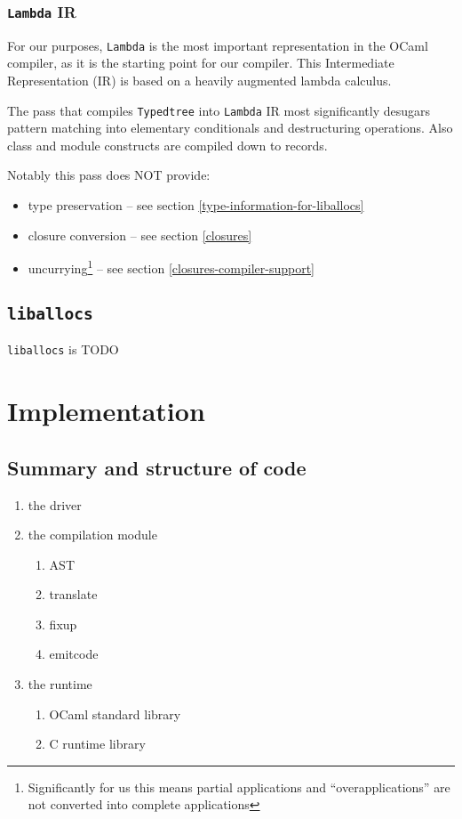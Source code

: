 \documentclass[12pt,a4paper,twoside,openright]{report}
\begin{document}
\subsection{\texttt{Lambda} IR}

For our purposes, \lstinline!Lambda! is the most important representation in
the OCaml compiler, as it is the starting point for our compiler. This
Intermediate Representation (IR) is based on a heavily augmented lambda calculus.

The pass that compiles \lstinline!Typedtree! into \lstinline!Lambda! IR most
significantly desugars pattern matching into elementary conditionals and
destructuring operations. Also class and module constructs are compiled down to
records.

Notably this pass does NOT provide:

\begin{itemize}
    \item type preservation -- see section \ref{type-information-for-liballocs}
    \item closure conversion -- see section \ref{closures}
    \item uncurrying\footnote{Significantly for us this means
        partial applications and ``overapplications'' are not converted into
        complete applications} -- see section \ref{closures-compiler-support}
\end{itemize}


\section{\texttt{liballocs}}

\lstinline!liballocs! is TODO


\chapter{Implementation}

\section{Summary and structure of code}

\begin{enumerate}
  \item the driver
  \item the compilation module
    \begin{enumerate}
      \item AST
      \item translate
      \item fixup
      \item emitcode
    \end{enumerate}
  \item the runtime
    \begin{enumerate}
      \item OCaml standard library
      \item C runtime library
    \end{enumerate}
\end{enumerate}
\end{document}

